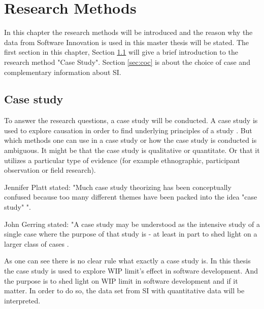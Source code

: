 \documentclass[UKenglish]{ifimaster}  %
\begin{document}
\chapter{Research Methods}
\label{chap:RM}
In this chapter the research methods will be introduced and the reason why the data from Software Innovation is used in this master thesis will be stated. The first section in this chapter, Section \ref{sec:CS} will give a brief introduction to the research method "Case Study".  Section \ref{sec:coc} is about the choice of case and complementary information about SI. 


\section{Case study}
\label{sec:CS}
To answer the research questions, a case study will be conducted.  A case study is used to explore causation in order to find underlying principles of a study \parencite{0078285763}\parencite{9781412960991}.  But which methods one can use in a case study or how the case study is conducted is ambiguous.  It might be that the case study is qualitative or quantitate.  Or that it utilizes a particular type of evidence (for example ethnographic, participant observation or field research). 

Jennifer Platt stated: "Much case study theorizing has been conceptually confused because too many different themes have been packed into the idea "case study" "\parencite{0521676568}.  

John Gerring stated: "A case study may be understood as the intensive study of a single case where the purpose of that study is - at least in part to shed light on a larger class of cases  \parencite{0521676568}.



As one can see there is no clear rule what exactly a case study is. In this thesis the case study is used to explore WIP limit's effect in software development.  And the purpose is to shed light on WIP limit in software development and if it matter. In order to do so, the data set from SI with quantitative data will be interpreted.
\end{document}
